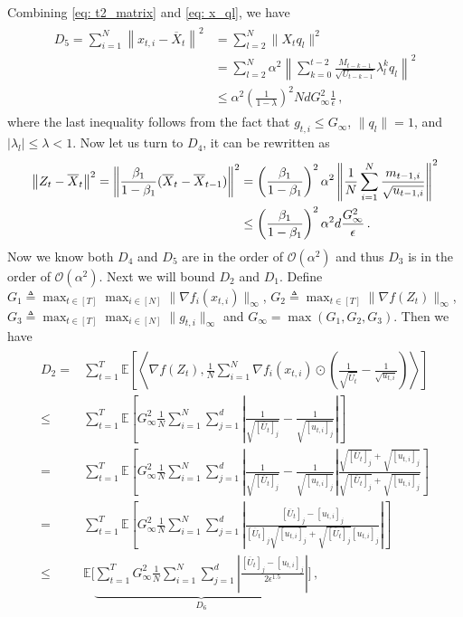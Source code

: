 \documentclass{article} %
\begin{document}
Combining \eqref{eq: t2_matrix} and \eqref{eq: x_ql}, we have
\begin{align} \label{eq: T_5_bound}
\begin{split}
D_5 = 	\sum_{i=1}^N\left\| {  x_{t,i} -   \overline X_{t}}  \right\|^2 & = \sum_{l=2}^N \|X_t q_l\|^2 \\
& =  \sum_{l=2}^N \alpha^2 \left \| \sum_{k=0}^{t-2} \frac{M_{t-k-1}}{\sqrt{U_{t-k-1}}} \lambda_{l}^{k}  q_l\right\|^2 \\
& \leq \alpha^2 \left (\frac{1}{1-\lambda} \right)^2 Nd G_{\infty}^2 \frac{1}{\epsilon} \, ,
\end{split}
\end{align}
where the last inequality follows from the fact that $g_{t,i} \leq G_{\infty}$, $\|q_l\| = 1$, and $|\lambda_l| \leq \lambda < 1$.
Now let us turn to $D_4$, it can be rewritten as 
\begin{align}\notag
\left\|  Z_{t} -  \overline X_{t}\right\|^2  = \left\| \frac{\beta_1}{1-\beta_1} (\overline X_t - \overline X_{t-1}) \right \|^2 & =\left( \frac{\beta_1}{1-\beta_1}\right)^2 \alpha^2 \left \|\frac{1}{N}\sum_{i=1}^N \frac{m_{t-1,i}}{\sqrt{u_{t-1,i}}}\right\|^2\\
& \leq \left( \frac{\beta_1}{1-\beta_1}\right)^2 \alpha^2 d \frac{G_{\infty}^2}{\epsilon}\, .
\end{align}
Now we know both $D_4$ and $D_5$ are in the order of  $\mathcal{O}(\alpha^2)$ and thus $D_3$ is in the order of  $\mathcal{O}(\alpha^2)$.
Next we will bound $D_2$ and $D_1$. Define  $G_1   \triangleq \max_{t \in [T]} \max_{i \in [N]} \|\nabla f_i(x_{t,i})\|_{\infty}$, $G_2   \triangleq \max_{t \in [T]}  \|\nabla f(Z_t)\|_{\infty}$, $G_3  \triangleq \max_{t \in [T]} \max_{i \in [N]} \|g_{t,i}\|_{\infty}$ and $G_{\infty} = \max(G_1,G_2,G_3)$.
Then we have 
\begin{align}\label{eq:T_2_bound}
\begin{split}
D_2 =& \sum_{t=1}^T \mathbb E \left [ \left \langle \nabla f( Z_{t}), \frac{1}{N} \sum_{i=1}^N \nabla f_i( x_{t,i})\odot \left( \frac{1}{\sqrt{\overline U_{t}}} -\frac{1}{\sqrt{u_{t,i}}}  \right)  \right \rangle \right]  \\
\leq & \sum_{t=1}^T \mathbb E \left [  G_{\infty}^2  \frac{1}{N} \sum_{i=1}^N \sum_{j=1}^d \left| \frac{1}{\sqrt{[\overline U_{t}]_j}} -\frac{1}{\sqrt{[u_{t,i}]_{j}}}  \right| \right]  \\
= & \sum_{t=1}^T \mathbb E \left [  G_{\infty}^2  \frac{1}{N} \sum_{i=1}^N \sum_{j=1}^d \left| \frac{1}{\sqrt{[\overline U_{t}]_j}} -\frac{1}{\sqrt{[u_{t,i}]_{j}}}  \right| \frac{\sqrt{[\overline U_{t}]_j} + \sqrt{[u_{t,i}]_{j}} }{\sqrt{[\overline U_{t}]_j} + \sqrt{[u_{t,i}]_{j}}} \right] \\
= & \sum_{t=1}^T \mathbb E \left [  G_{\infty}^2  \frac{1}{N} \sum_{i=1}^N \sum_{j=1}^d \left| \frac{[\overline U_{t}]_j - [u_{t,i}]_{j} }{{[\overline U_{t}]_j}\sqrt{[u_{t,i}]_{j}} + \sqrt{[\overline U_{t}]_j}{[u_{t,i}]_{j}}}  \right| \right]  \\
\leq &   \mathbb E \bigg [ \underbrace{ \sum_{t=1}^T  G_{\infty}^2  \frac{1}{N} \sum_{i=1}^N \sum_{j=1}^d \left| \frac{[\overline U_{t}]_j - [u_{t,i}]_{j} }{2 \epsilon^{1.5}}  \right| }_{D_6} \bigg ] \, , 
\end{split}
\end{align}
\end{document}
